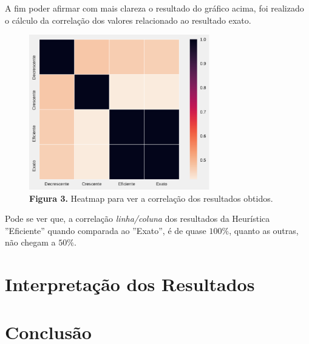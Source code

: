 \documentclass[a4paper, 12pt]{article}
\begin{document}
A fim poder afirmar com mais clareza o resultado do gráfico acima, foi realizado o cálculo da correlação dos valores 
relacionado ao resultado exato.
\begin{figure}[h]
    \centering
    \includegraphics[width=0.7\textwidth]{../imgs/heatmap.pdf}
    \caption{\textbf{Figura 3.} Heatmap para ver a correlação dos resultados obtidos.}
    \label{heatmap}
\end{figure}

Pode se ver que, a correlação \textit{linha/coluna} dos resultados da Heurística ''Eficiente'' quando comparada ao ''Exato'', é de quase $100\%$,
quanto as outras, não chegam a $50\%$.

\section{Interpretação dos Resultados}


\section{Conclusão}

{}

\end{document}
